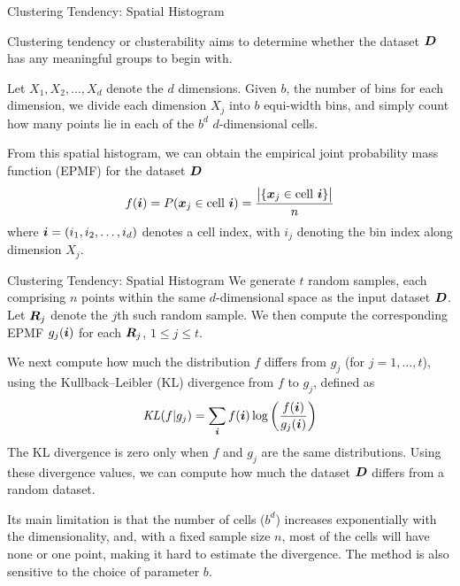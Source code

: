 \begin{frame}{Clustering Tendency: Spatial Histogram}

Clustering tendency or clusterability
aims to determine whether the dataset ${\boldsymbol D}$ has any
meaningful groups to begin with. 

\medskip
Let $X_1, X_2, \ldots, X_d$ denote the $d$ dimensions. Given
$b$, the number of bins for each dimension, we divide each dimension
$X_{j}$ into $b$ equi-width bins, and simply count how many points lie in
each of the $b^d$ $d$-dimensional cells.  

\medskip
From this spatial histogram, we
can obtain the empirical joint probability mass function (EPMF) for the
dataset ${\boldsymbol D}$
\begin{align*}
  f({\boldsymbol i}) = P({\boldsymbol x}_{j} \in \text{cell }{\boldsymbol i}) =
  \frac{\bigl|\{{\boldsymbol x}_{j} \in \text{cell }{\boldsymbol i}\}\bigr|}{n}
\end{align*}
where ${\boldsymbol i} = (i_1,i_2,\ldots,i_d)$ denotes a cell index, with $i_{j}$
denoting
the bin index along dimension $X_{j}$.
\end{frame}


\begin{frame}{Clustering Tendency: Spatial Histogram}
We generate $t$ random samples, each comprising $n$ points within
the same $d$-dimensional space as the input dataset ${\boldsymbol D}$.  
Let ${\boldsymbol R}_{j}$
denote the $j$th such random sample. 
We then compute the
corresponding EPMF $g_{j}({\boldsymbol i})$ for each ${\boldsymbol R}_{j}$, $1\le j\le t$.

\medskip
We next compute how much the distribution $f$ differs from
$g_{j}$ (for $j=1,\ldots,t$),
using the Kullback--Leibler (KL) divergence from $f$ to
$g_{j}$, def\/{i}ned as
\begin{align*}
  \mathit{KL}(f|g_{j}) = \sum_{{\boldsymbol i}} f({\boldsymbol i}) \log \left(\frac{f({\boldsymbol i})}{g_{j}({\boldsymbol i})} \right)
\end{align*}
The KL divergence is zero only when $f$ and $g_{j}$ are the same
distributions. Using these divergence values, we can compute how much
the dataset ${\boldsymbol D}$ differs from a random dataset.

\medskip

Its main limitation is that the number of cells
($b^d$) increases exponentially with the dimensionality, and, with a f\/{i}xed sample size $n$, most
of the cells will have none or one point, making it hard
to estimate the divergence. The method is also sensitive to the choice
of parameter $b$.
\end{frame}



